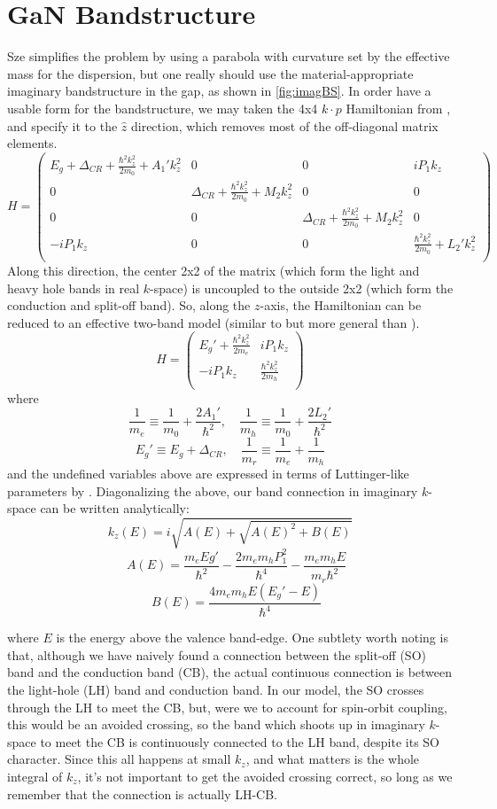 \section{GaN Bandstructure}
Sze simplifies the problem by using a parabola with curvature set by the effective mass for the dispersion, but one really should use the material-appropriate imaginary bandstructure in the gap, as shown in \ref{fig:imagBS}.  In order have a usable form for the bandstructure, we may taken the 4x4 $k\cdot p$ Hamiltonian from \cite{Rinke_2008}, and specify it to the $\hat{z}$ direction, which removes most of the off-diagonal matrix elements.
\[
  H=\begin{pmatrix}
    E_g+\Delta_{CR}+\frac{\hbar^2k_z^2}{2m_0}+A_1'k_z^2 & 0 & 0 &iP_1k_z\\
    0 &  \Delta_{CR}+\frac{\hbar^2k_z^2}{2m_0}+M_2k_z^2 & 0 & 0 \\
    0 & 0 & \Delta_{CR}+\frac{\hbar^2k_z^2}{2m_0}+M_2k_z^2 & 0 \\
    -iP_1k_z & 0 & 0 & \frac{\hbar^2k_z^2}{2m_0}+L_2'k_z^2  \\
  \end{pmatrix}
\]
Along this direction, the center 2x2 of the matrix (which form the light and heavy hole bands in real $k$-space) is uncoupled to the outside 2x2 (which form the conduction and split-off band).  So, along the $z$-axis, the Hamiltonian can be reduced to an effective two-band model (similar to but more general than \cite{Kane_1960}).
\[
  H=\begin{pmatrix}
    E_g'+\frac{\hbar^2k_z^2}{2m_e} & iP_1k_z\\
    -iP_1k_z & \frac{\hbar^2k_z^2}{2m_h} \\
  \end{pmatrix}
\]
where
\[\frac{1}{m_e}\equiv\frac{1}{m_0}+\frac{2A_1'}{\hbar^2},
\quad \frac{1}{m_h}\equiv\frac{1}{m_0}+\frac{2L_2'}{\hbar^2}
\]
\[
  E_g'\equiv E_g+\Delta_{CR}, \quad
\frac{1}{m_r}\equiv\frac{1}{m_e}+\frac{1}{m_h}
\]
and the undefined variables above are expressed in terms of Luttinger-like parameters by \cite{Rinke_2008}.  Diagonalizing the above, our band connection in imaginary $k$-space can be written analytically:
$$k_z(E)=i\sqrt{A(E)+\sqrt{A(E)^2+B(E)}}$$
$$\quad A(E)=\frac{m_eEg'}{\hbar^2}-\frac{2m_em_hP_1^2}{\hbar^4}-\frac{m_em_hE}{m_r\hbar^2}$$
$$\quad B(E)=\frac{4m_em_hE(E_g'-E)}{\hbar^4}$$

where $E$ is the energy above the valence band-edge.  One subtlety worth noting is that, although we have naively found a connection between the split-off (SO) band and the conduction band (CB), the actual continuous connection is between the light-hole (LH) band and conduction band.  In our model, the SO crosses through the LH to meet the CB, but, were we to account for spin-orbit coupling, this would be an avoided crossing, so the band which shoots up in imaginary $k$-space to meet the CB is continuously connected to the LH band, despite its SO character.  Since this all happens at small $k_z$, and what matters is the whole integral of $k_z$, it's not important to get the avoided crossing correct, so long as we remember that the connection is actually LH-CB.

